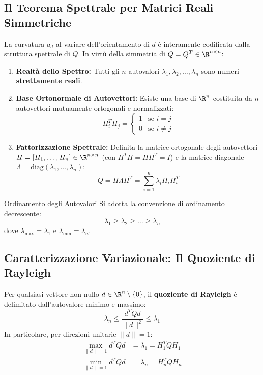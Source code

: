 \subsection{Il Teorema Spettrale per Matrici Reali Simmetriche}
La curvatura $a_d$ al variare dell'orientamento di $d$ \`e interamente codificata dalla struttura spettrale di $Q$. In virt\`u della simmetria di $Q = Q^T \in \R^{n \times n}$:
\begin{enumerate}
    \item \textbf{Realt\`a dello Spettro:} Tutti gli $n$ autovalori $\lambda_1, \lambda_2, \dots, \lambda_n$ sono numeri \textbf{strettamente reali}.
    \item \textbf{Base Ortonormale di Autovettori:} Esiste una base di $\R^n$ costituita da $n$ autovettori mutuamente ortogonali e normalizzati:
    \begin{equation}
    H_i^T H_j = \begin{cases} 1 & \text{se } i = j \\ 0 & \text{se } i \neq j \end{cases}
    \end{equation}
    \item \textbf{Fattorizzazione Spettrale:} Definita la matrice ortogonale degli autovettori $H = [H_1, \dots, H_n] \in \R^{n \times n}$ (con $H^T H = H H^T = I$) e la matrice diagonale $\Lambda = \text{diag}(\lambda_1, \dots, \lambda_n)$:
    \begin{equation}
    Q = H \Lambda H^T = \sum_{i=1}^n \lambda_i H_i H_i^T
    \end{equation}
\end{enumerate}

\begin{noteblock}{Ordinamento degli Autovalori}
Si adotta la convenzione di ordinamento decrescente:
\begin{equation}
\lambda_1 \ge \lambda_2 \ge \dots \ge \lambda_n
\end{equation}
dove $\lambda_{\max} = \lambda_1$ e $\lambda_{\min} = \lambda_n$.
\end{noteblock}

\subsection{Caratterizzazione Variazionale: Il Quoziente di Rayleigh}
Per qualsiasi vettore non nullo $d \in \R^n \setminus \{0\}$, il \textbf{quoziente di Rayleigh} \`e delimitato dall'autovalore minimo e massimo:
\begin{equation}
\lambda_n \le \frac{d^T Q d}{\|d\|^2} \le \lambda_1
\end{equation}
In particolare, per direzioni unitarie $\|d\| = 1$:
\begin{align}
\max_{\|d\|=1} d^T Q d &= \lambda_1 = H_1^T Q H_1 \\
\min_{\|d\|=1} d^T Q d &= \lambda_n = H_n^T Q H_n
\end{align}

